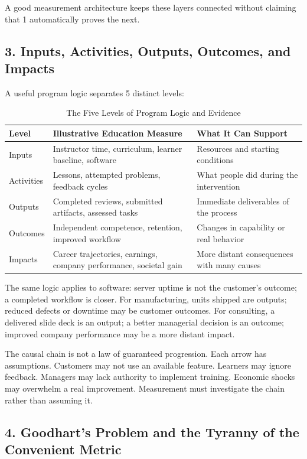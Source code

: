 A good measurement architecture keeps these layers connected without claiming that 1 automatically proves the next.

\subsection*{3. Inputs, Activities, Outputs, Outcomes, and Impacts}

A useful program logic separates 5 distinct levels:

\begin{table}[t]
\centering
\small
\caption{The Five Levels of Program Logic and Evidence}
\begin{tabularx}{\textwidth}{p{}p{}X}
\toprule
\textbf{Level} & \textbf{Illustrative Education Measure} & \textbf{What It Can Support} \\
\midrule
Inputs & Instructor time, curriculum, learner baseline, software & Resources and starting conditions \\
Activities & Lessons, attempted problems, feedback cycles & What people did during the intervention \\
Outputs & Completed reviews, submitted artifacts, assessed tasks & Immediate deliverables of the process \\
Outcomes & Independent competence, retention, improved workflow & Changes in capability or real behavior \\
Impacts & Career trajectories, earnings, company performance, societal gain & More distant consequences with many causes \\
\bottomrule
\end{tabularx}
\end{table}

The same logic applies to software: server uptime is not the customer's outcome; a completed workflow is closer. For manufacturing, units shipped are outputs; reduced defects or downtime may be customer outcomes. For consulting, a delivered slide deck is an output; a better managerial decision is an outcome; improved company performance may be a more distant impact.

The causal chain is not a law of guaranteed progression. Each arrow has assumptions. Customers may not use an available feature. Learners may ignore feedback. Managers may lack authority to implement training. Economic shocks may overwhelm a real improvement. Measurement must investigate the chain rather than assuming it.

\subsection*{4. Goodhart's Problem and the Tyranny of the Convenient Metric}

